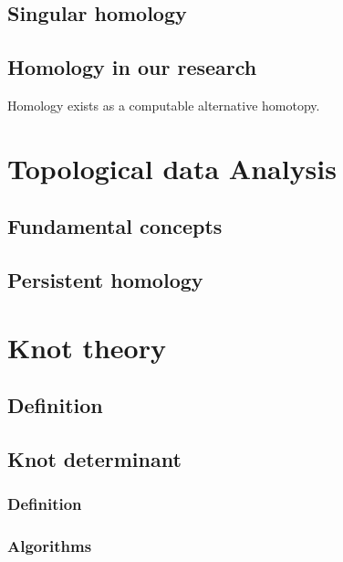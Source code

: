 \documentclass[12pt]{article}
\begin{document}
\subsection{Singular homology}

\subsection{Homology in our research}

Homology exists as a computable alternative homotopy.

\newpage
\thispagestyle{empty}
\mbox{}
\newpage

\section{Topological data Analysis}

\subsection{Fundamental concepts}

\subsection{Persistent homology}

\newpage
\thispagestyle{empty}
\mbox{}
\newpage

\section{Knot theory}

\subsection{Definition}

\subsection{Knot determinant}

\subsubsection{Definition}

\subsubsection{Algorithms}

\newpage
\thispagestyle{empty}
\mbox{}
\newpage
\end{document}
